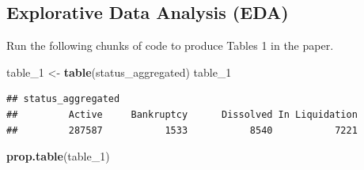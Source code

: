\documentclass[]{article}
\newenvironment{Shaded}{\begin{snugshade}}{\end{snugshade}}
\newcommand{\DecValTok}[1]{\textcolor[rgb]{0.00,0.00,0.81}{#1}}
\newcommand{\KeywordTok}[1]{\textcolor[rgb]{0.13,0.29,0.53}{\textbf{#1}}}
\newcommand{\NormalTok}[1]{#1}
\newcommand{\OperatorTok}[1]{\textcolor[rgb]{0.81,0.36,0.00}{\textbf{#1}}}
\newcommand{\StringTok}[1]{\textcolor[rgb]{0.31,0.60,0.02}{#1}}
\begin{document}
\begin{Shaded}
\end{Shaded}

\hypertarget{explorative-data-analysis-eda}{%
\subsection{Explorative Data Analysis
(EDA)}\label{explorative-data-analysis-eda}}

Run the following chunks of code to produce Tables 1 in the paper.

\begin{Shaded}
\begin{Highlighting}[]
\NormalTok{table_}\DecValTok{1}\NormalTok{ <-}\StringTok{ }\KeywordTok{table}\NormalTok{(status_aggregated)}
\NormalTok{table_}\DecValTok{1}
\end{Highlighting}
\end{Shaded}

\begin{verbatim}
## status_aggregated
##         Active     Bankruptcy      Dissolved In Liquidation 
##         287587           1533           8540           7221
\end{verbatim}

\begin{Shaded}
\begin{Highlighting}[]
\KeywordTok{prop.table}\NormalTok{(table_}\DecValTok{1}\NormalTok{)}
\end{Highlighting}
\end{Shaded}
\end{document}
